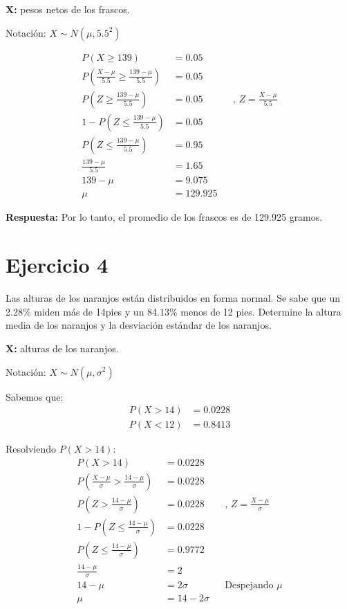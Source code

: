 \documentclass{templateNote}
\begin{document}
\textbf{X:} pesos netos de los frascos.

Notación: $X \sim N(\mu, 5.5^2)$

\begin{align*}
  P(X \geq 139) &= 0.05 \\
  P\left(\frac{X - \mu}{5.5} \geq \frac{139 - \mu}{5.5}\right) &= 0.05 \\
  P\left(Z \geq \frac{139 - \mu}{5.5}\right) &= 0.05 && \text{, } Z = \frac{X - \mu}{5.5} \\
  1 - P\left(Z \leq \frac{139 - \mu}{5.5}\right) &= 0.05 \\
  P\left(Z \leq \frac{139 - \mu}{5.5}\right) &= 0.95 \\
  \frac{139 - \mu}{5.5} &= 1.65 \\
  139 - \mu &= 9.075 \\
  \mu &= 129.925
\end{align*}

\textbf{Respuesta:} Por lo tanto, el promedio de los frascos es de 129.925 gramos.

\newpage
\section*{Ejercicio 4}
Las alturas de los naranjos están distribuidos en forma normal. Se sabe que un 2.28\% miden más de 14pies y un 84.13\% menos de 12 pies. Determine la altura media de los naranjos y la desviación estándar de los naranjos.

\textbf{X:} alturas de los naranjos.

Notación: $X \sim N(\mu, \sigma^2)$

Sabemos que:
\begin{align*}
  P(X > 14) &= 0.0228 \\
  P(X < 12) &= 0.8413
\end{align*}

Resolviendo $P(X > 14)$:
\begin{align*}
  P(X > 14) &= 0.0228 \\
  P\left(\frac{X - \mu}{\sigma} > \frac{14 - \mu}{\sigma}\right) &= 0.0228 \\
  P\left(Z > \frac{14 - \mu}{\sigma}\right) &= 0.0228 && \text{, } Z = \frac{X - \mu}{\sigma} \\
  1 - P\left(Z \leq \frac{14 - \mu}{\sigma}\right) &= 0.0228 \\
  P\left(Z \leq \frac{14 - \mu}{\sigma}\right) &= 0.9772 \\
  \frac{14 - \mu}{\sigma} &= 2 \\
  14 - \mu &= 2\sigma && \text{Despejando } \mu \\
  \mu &= 14 - 2\sigma
\end{align*}
\end{document}
